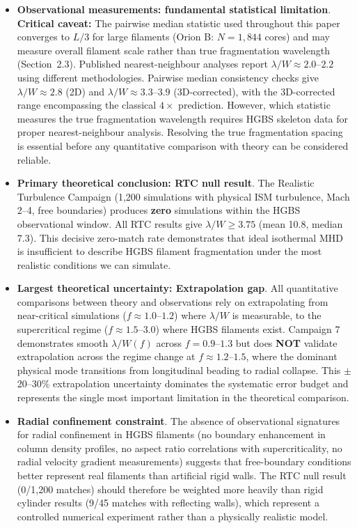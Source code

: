 \documentclass[twocolumn]{mnras}
\begin{document}
\begin{itemize}
    \item \textbf{Observational measurements: fundamental statistical limitation}.
    \textbf{Critical caveat:} The pairwise median statistic used throughout this paper converges to $L/3$ for large filaments (Orion B: $N = 1,844$ cores) and may measure overall filament scale rather than true fragmentation wavelength (Section~2.3). Published nearest-neighbour analyses report $\lambda/W \approx 2.0$--$2.2$ using different methodologies. Pairwise median consistency checks give $\lambda/W \approx 2.8$ (2D) and $\lambda/W \approx 3.3$--$3.9$ (3D-corrected), with the 3D-corrected range encompassing the classical $4\times$ prediction. However, which statistic measures the true fragmentation wavelength requires HGBS skeleton data for proper nearest-neighbour analysis. Resolving the true fragmentation spacing is essential before any quantitative comparison with theory can be considered reliable.

    \item \textbf{Primary theoretical conclusion: RTC null result}. The Realistic Turbulence Campaign (1,200 simulations with physical ISM turbulence, Mach 2--4, free boundaries) produces \textbf{zero} simulations within the HGBS observational window. All RTC results give $\lambda/W \geq 3.75$ (mean 10.8, median 7.3). This decisive zero-match rate demonstrates that ideal isothermal MHD is insufficient to describe HGBS filament fragmentation under the most realistic conditions we can simulate.

    \item \textbf{Largest theoretical uncertainty: Extrapolation gap}. All quantitative comparisons between theory and observations rely on extrapolating from near-critical simulations ($f \approx 1.0$--$1.2$) where $\lambda/W$ is measurable, to the supercritical regime ($f \approx 1.5$--$3.0$) where HGBS filaments exist. Campaign 7 demonstrates smooth $\lambda/W(f)$ across $f = 0.9$--$1.3$ but does \textbf{NOT} validate extrapolation across the regime change at $f \approx 1.2$--$1.5$, where the dominant physical mode transitions from longitudinal beading to radial collapse. This $\pm$20--30\% extrapolation uncertainty dominates the systematic error budget and represents the single most important limitation in the theoretical comparison.

    \item \textbf{Radial confinement constraint}. The absence of observational signatures for radial confinement in HGBS filaments (no boundary enhancement in column density profiles, no aspect ratio correlations with supercriticality, no radial velocity gradient measurements) suggests that free-boundary conditions better represent real filaments than artificial rigid walls. The RTC null result (0/1,200 matches) should therefore be weighted more heavily than rigid cylinder results (9/45 matches with reflecting walls), which represent a controlled numerical experiment rather than a physically realistic model.


\end{itemize}
\end{document}
